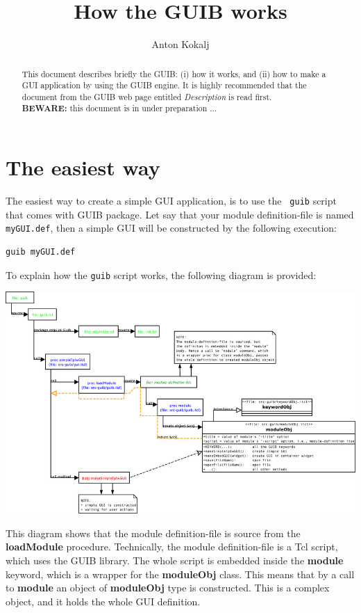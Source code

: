 \documentclass[12pt]{article}
\def\key#1{{\bf #1}}
\begin{document}
\title{How the GUIB works}
\author{Anton Kokalj}
\maketitle
\begin{abstract}
  This document describes briefly the GUIB: (i) how it works, and (ii)
  how to make a GUI application by using the GUIB engine. It is highly
  recommended that the document from the GUIB web page entitled {\em
    Description} is read first.
  \\[1em]
  {\bf BEWARE:} this document is in under preparation ...
\end{abstract}

\tableofcontents

\section{The easiest way}

The easiest way to create a simple GUI application, is to use the {\tt
  guib} script that comes with GUIB package. Let say that your module
definition-file is named {\tt myGUI.def}, then a simple GUI will be
constructed by the following execution: 
\begin{verbatim}
guib myGUI.def 
\end{verbatim}

To explain how the {\tt guib} script works, the following diagram is
provided:

\includegraphics[width=1.0\textwidth]{diagrams/Guib.png}

This diagram shows that the module definition-file is source from the
\key{loadModule} procedure. Technically, the module definition-file is
a Tcl script, which uses the GUIB library. The whole script is
embedded inside the \key{module} keyword, which is a wrapper for the
\key{moduleObj} class. This means that by a call to \key{module} an
object of \key{moduleObj} type is constructed. This is a complex
object, and it holds the whole GUI definition.
\end{document}
